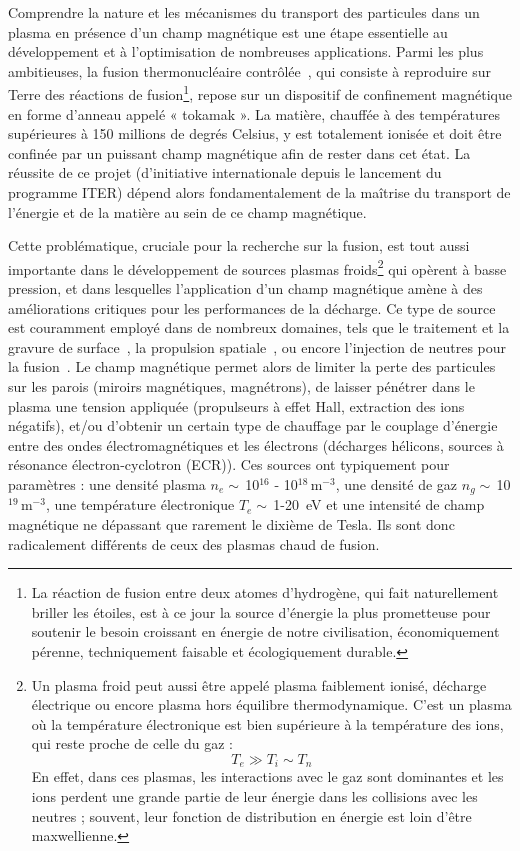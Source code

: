 
\begin{refsection}
Comprendre la nature et les mécanismes du transport des particules dans un
plasma en présence d'un champ magnétique est une étape essentielle au
développement et à l'optimisation de nombreuses applications.
Parmi les plus ambitieuses, la fusion thermonucléaire
contrôlée~\parencite{Wesson}, qui consiste à reproduire sur Terre des réactions
de fusion\footnote{La réaction de fusion entre deux atomes d'hydrogène, qui fait naturellement briller les
étoiles, est à ce jour la source d'énergie la plus prometteuse pour soutenir le besoin croissant en énergie de notre civilisation,
économiquement pérenne, techniquement faisable et écologiquement durable.},
repose sur un dispositif de confinement magnétique en forme d'anneau appelé « tokamak ».
La matière, chauffée à des températures supérieures à 150 millions de degrés
Celsius, y est totalement ionisée et doit être confinée par un puissant champ magnétique afin
de rester dans cet état. La réussite de ce projet (d'initiative
internationale depuis le lancement du programme ITER) dépend alors
fondamentalement de la maîtrise du transport de l'énergie et de la matière au
sein de ce champ magnétique.

Cette problématique, cruciale pour la recherche sur la fusion, est tout aussi
importante dans le développement de sources plasmas froids\footnote{Un plasma
froid peut aussi être appelé plasma faiblement ionisé, décharge électrique ou
encore plasma hors équilibre thermodynamique.
C'est un plasma où la température électronique est bien supérieure à
la température des ions, qui reste proche de celle du gaz :$$T_e\gg
T_i\sim T_n$$ En effet, dans ces plasmas, les interactions avec le gaz sont dominantes et les
ions perdent une grande partie de
leur énergie dans les collisions avec les neutres ; souvent, leur fonction de
distribution en énergie est loin d'être maxwellienne.} qui opèrent à basse pression, et dans lesquelles
l'application d'un champ magnétique amène à des améliorations critiques pour les
performances de la décharge. Ce type de source est couramment employé dans de
nombreux domaines, tels que le traitement et la gravure de
surface~\parencite{Lieberman}, la propulsion spatiale~\parencite{Zhurin}, ou
encore l'injection de neutres pour la fusion~\parencite{SimoninHDR}. Le champ
magnétique permet alors de limiter la perte des particules sur les parois (miroirs magnétiques, magnétrons), de laisser pénétrer dans le plasma une tension appliquée (propulseurs à effet Hall, extraction des ions négatifs), et/ou d'obtenir un certain type de chauffage par le couplage d'énergie entre des ondes électromagnétiques et les électrons (décharges hélicons, sources à résonance électron-cyclotron (ECR)). Ces sources ont typiquement pour paramètres : une
densité plasma $n_e\sim\,$10$^{16}$ - 10$^{18}\,$m$^{-3}$, une densité de gaz
$n_g\sim\,$10$^{19}\,$m$^{-3}$, une température électronique $T_e\sim\,$1-20~eV
et une intensité de champ magnétique ne dépassant que rarement le
dixième de Tesla. Ils sont donc radicalement différents de ceux des plasmas chaud de
fusion.


\end{refsection}
